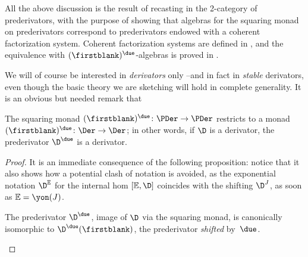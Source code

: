 \begin{remark}
All the above discussion is the result of recasting \cite{Korostenski199357} in the 2-category of prederivators, with the purpose of showing that algebras for the squaring monad on prederivators correspond to prederivators endowed with a coherent factorization system. Coherent factorization systems are defined in \adef{}, and the equivalence with $(\firstblank)^\due$-algebras is proved in \athm{}.
\end{remark}
We will of course be interested in \emph{derivators} only --and in fact in \emph{stable} derivators, even though the basic theory we are sketching will hold in complete generality. It is an obvious but needed remark that
\begin{proposition}
The squaring monad $(\firstblank)^\due\colon \PDer \to \PDer$ restricts to a
monad $(\firstblank)^\due\colon \Der \to \Der$; in other words, if $\D$ is a
derivator, the prederivator $\D^\due$ is a derivator.
\end{proposition}
\begin{proof}
It is an immediate consequence of the following proposition: notice that it also shows how a potential clash of notation is avoided, as the exponential notation $\D^{\mathbb{E}}$ for the internal hom $[\mathbb{E},\D]$ coincides with the shifting $\D^J$, as soon as $\mathbb{E}=\yon(J)$.
\begin{proposition}
The prederivator $\D^\due$, image of $\D$ via the squaring monad, is canonically isomorphic to $\D^{\due}(\firstblank)$, the prederivator \emph{shifted} by~$\due$. \qedhere
\end{proposition}
\end{proof}







